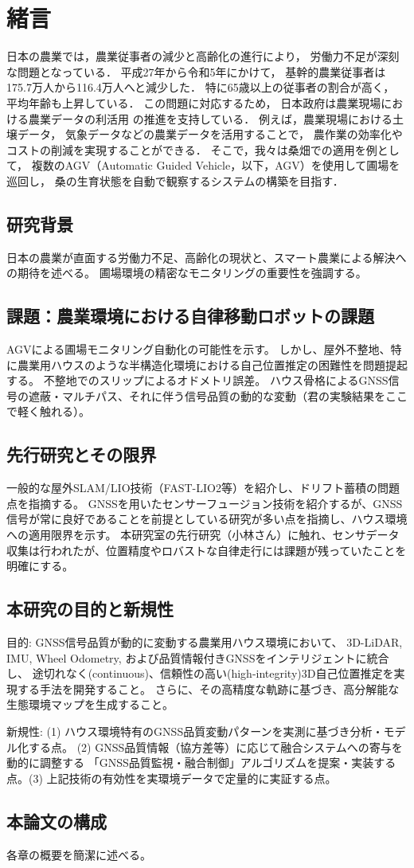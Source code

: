 \documentclass[main]{subfiles}
\begin{document}
\chapter{緒言}
日本の農業では，農業従事者の減少と高齢化の進行により，
労働力不足が深刻な問題となっている\cite{ref:nourin}．
平成27年から令和5年にかけて，
基幹的農業従事者は175.7万人から116.4万人へと減少した．
特に65歳以上の従事者の割合が高く，
平均年齢も上昇している\cite{ref:roudou}．
この問題に対応するため，
日本政府は農業現場における農業データの利活用
の推進を支持している\cite{ref:nou_data}．
例えば，農業現場における土壌データ，
気象データなどの農業データを活用することで，
農作業の効率化やコストの削減を実現することができる．
そこで，我々は桑畑での適用を例として，
複数のAGV（Automatic Guided Vehicle，以下，AGV）を使用して圃場を巡回し，
桑の生育状態を自動で観察するシステムの構築を目指す．

\section{研究背景}
日本の農業が直面する労働力不足、高齢化の現状と、スマート農業による解決への期待を述べる。
圃場環境の精密なモニタリングの重要性を強調する。

\section{課題：農業環境における自律移動ロボットの課題}
AGVによる圃場モニタリング自動化の可能性を示す。
しかし、屋外不整地、特に農業用ハウスのような半構造化環境における自己位置推定の困難性を問題提起する。
不整地でのスリップによるオドメトリ誤差。
ハウス骨格によるGNSS信号の遮蔽・マルチパス、それに伴う信号品質の動的な変動（君の実験結果をここで軽く触れる）。

\section{先行研究とその限界}
一般的な屋外SLAM/LIO技術（FAST-LIO2等）を紹介し、ドリフト蓄積の問題点を指摘する。
GNSSを用いたセンサーフュージョン技術を紹介するが、GNSS信号が常に良好であることを前提としている研究が多い点を指摘し、ハウス環境への適用限界を示す。
本研究室の先行研究（小林さん）に触れ、センサデータ収集は行われたが、位置精度やロバストな自律走行には課題が残っていたことを明確にする。

\section{本研究の目的と新規性}
目的: GNSS信号品質が動的に変動する農業用ハウス環境において、
3D-LiDAR, IMU, Wheel Odometry, および品質情報付きGNSSをインテリジェントに統合し、
途切れなく(continuous)、信頼性の高い(high-integrity)3D自己位置推定を実現する手法を開発すること。
さらに、その高精度な軌跡に基づき、高分解能な生態環境マップを生成すること。

新規性: 
(1) ハウス環境特有のGNSS品質変動パターンを実測に基づき分析・モデル化する点。
(2) GNSS品質情報（協方差等）に応じて融合システムへの寄与を動的に調整する
「GNSS品質監視・融合制御」アルゴリズムを提案・実装する点。(3) 上記技術の有効性を実環境データで定量的に実証する点。

\section{本論文の構成}
各章の概要を簡潔に述べる。 
\end{document}
